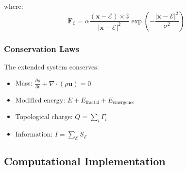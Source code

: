\documentclass[12pt]{article}
\newcommand{\emergencept}{\mathcal{E}}
\begin{document}
where:
\begin{equation}
\mathbf{F}_{\emergencept} = \alpha \frac{(\mathbf{x} - \emergencept) \times \hat{z}}{|\mathbf{x} - \emergencept|^2} \exp\left(-\frac{|\mathbf{x} - \emergencept|^2}{\sigma^2}\right)
\end{equation}

\subsubsection{Conservation Laws}

The extended system conserves:
\begin{itemize}
\item Mass: $\frac{\partial \rho}{\partial t} + \nabla \cdot (\rho \mathbf{u}) = 0$
\item Modified energy: $E + E_{\text{fractal}} + E_{\text{emergence}}$
\item Topological charge: $Q = \sum_i \Gamma_i$
\item Information: $I = \sum_{\emergencept} S_{\emergencept}$
\end{itemize}

\subsection{Computational Implementation}
\end{document}
